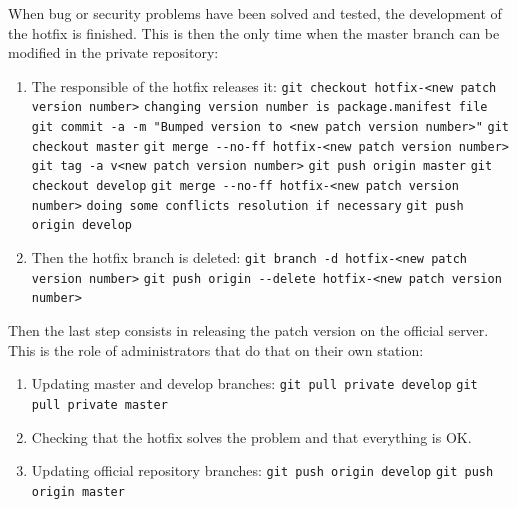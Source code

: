 \documentclass[12pt,a4paper]{article}
\begin{document}
When bug or security problems have been solved and tested, the development of the hotfix is finished. This is then the only time when the master branch can be modified in the private repository:
\begin{enumerate}
\item The responsible of the hotfix releases it:
\linebreak \verb|git checkout hotfix-<new patch version number>|
\linebreak \verb|changing version number is package.manifest file|
\linebreak \verb|git commit -a -m "Bumped version to <new patch version number>"|
\linebreak \verb|git checkout master|
\linebreak \verb|git merge --no-ff hotfix-<new patch version number>|
\linebreak \verb|git tag -a v<new patch version number>|
\linebreak \verb|git push origin master|
\linebreak \verb|git checkout develop|
\linebreak \verb|git merge --no-ff hotfix-<new patch version number>|
\linebreak \verb|doing some conflicts resolution if necessary|
\linebreak \verb|git push origin develop|
\item Then the hotfix branch is deleted:
\linebreak \verb|git branch -d hotfix-<new patch version number>|
\linebreak \verb|git push origin --delete hotfix-<new patch version number>|
\end{enumerate}

Then the last step consists in releasing the patch version on the official server. This is the role of administrators that do that on their own station:
\begin{enumerate}
\item Updating master and develop branches:
\linebreak \verb|git pull private develop|
\linebreak \verb|git pull private master|
\item Checking that the hotfix solves the problem and that everything is OK.
\item Updating official repository branches:
\linebreak \verb|git push origin develop|
\linebreak \verb|git push origin master|
\end{enumerate}
\end{document}
